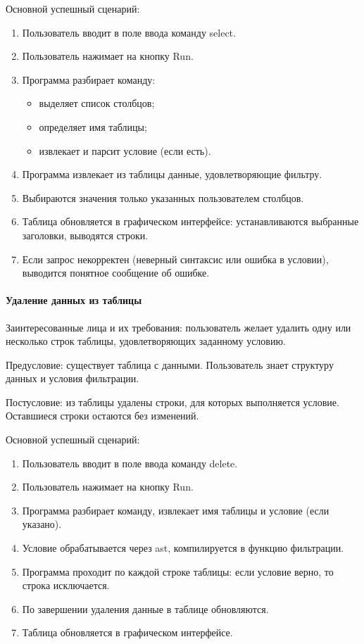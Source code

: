 Основной успешный сценарий:
\begin{enumerate}
	\item Пользователь вводит в поле ввода команду select.
	\item Пользователь нажимает на кнопку Run.	
	\item Программа разбирает команду:
	\begin{itemize}
		\item выделяет список столбцов;		
		\item определяет имя таблицы;		
		\item извлекает и парсит условие (если есть).
	\end{itemize}
	\item Программа извлекает из таблицы данные, удовлетворяющие фильтру.	
	\item Выбираются значения только указанных пользователем столбцов.	
	\item Таблица обновляется в графическом интерфейсе: устанавливаются выбранные заголовки, выводятся строки.	
	\item Если запрос некорректен (неверный синтаксис или ошибка в условии), выводится понятное сообщение об ошибке.
\end{enumerate}

\paragraph{Удаление данных из таблицы}

Заинтересованные лица и их требования: пользователь желает удалить одну или несколько строк таблицы, удовлетворяющих заданному условию.

Предусловие: существует таблица с данными. Пользователь знает структуру данных и условия фильтрации.

Постусловие: из таблицы удалены строки, для которых выполняется условие. Оставшиеся строки остаются без изменений.

Основной успешный сценарий:
\begin{enumerate}
	\item Пользователь вводит в поле ввода команду delete.
	\item Пользователь нажимает на кнопку Run.		
	\item Программа разбирает команду, извлекает имя таблицы и условие (если указано).	
	\item Условие обрабатывается через ast, компилируется в функцию фильтрации.	
	\item Программа проходит по каждой строке таблицы: если условие верно, то строка исключается.	
	\item По завершении удаления данные в таблице обновляются.	
	\item Таблица обновляется в графическом интерфейсе.
\end{enumerate}

